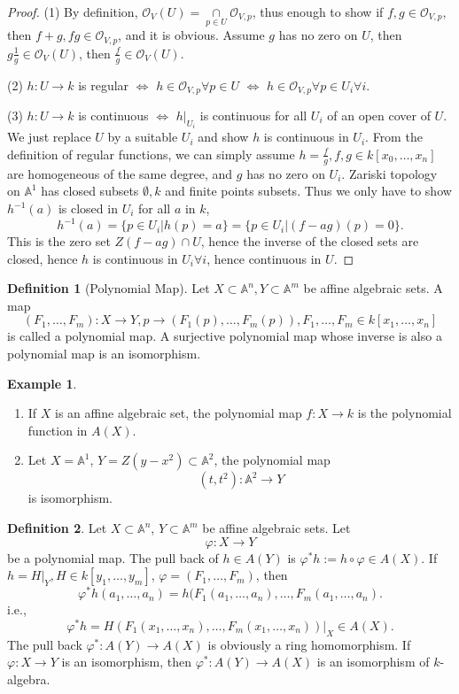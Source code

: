 \documentclass{amsart}
\theoremstyle{plain}
\theoremstyle{definition}
\newtheorem{definition}{Definition}
\newtheorem{example}{Example}
\theoremstyle{remark}
\numberwithin{equation}{section}
\begin{document}
\begin{proof}
	(1) By definition, $ \mathcal{O}_V(U)=\mathop{\cap}\limits_{p\in U} \mathcal{O}_{V,p} $, thus enough to show if $ f,g\in \mathcal{O}_{V,p} $, then $ f+g, fg \in \mathcal{O}_{V,p}$, and it is obvious. Assume $ g $ has no zero on $ U $, then $ g\frac{1}{g}\in \mathcal{O}_V(U) $, then $ \frac{f}{g}\in \mathcal{O}_V(U) $.

	(2) $ h:U\to k $ is regular $ \Leftrightarrow $ $ h\in \mathcal{O}_{V,p} \forall p\in U$ $ \Leftrightarrow $ $ h\in \mathcal{O}_{V,p} \forall p\in U_i \forall i$.

	(3) $ h:U\to k  $ is continuous $ \Leftrightarrow $ $ h|_{U_i} $ is continuous for all $ U_i $ of an open cover of $ U $. We just replace $ U $ by a suitable $ U_i $ and show $ h $ is continuous in $ U_i $. From the definition of regular functions, we can simply assume $ h=\frac{f}{g}, f,g\in k[x_0,\dots,x_n] $ are homogeneous of the same degree, and $ g $ has no zero on $ U_i $. Zariski topology on $ \mathbb{A}^1 $ has closed subsets $ \emptyset,k $ and finite points subsets. Thus we only have to show $ h^{-1}(a) $ is closed in $ U_i $ for all $ a $ in $ k $,
	\begin{equation}
	h^{-1}(a)=\{ p\in U_i|h(p)=a \}= \{ p\in U_i|(f-ag)(p)=0 \}.
	\end{equation}
	This is the zero set $ Z(f-ag)\cap U $, hence the inverse of the closed sets are closed, hence $ h $ is continuous in $ U_i \forall i$, hence continuous in $ U $.
\end{proof}
\begin{definition}[Polynomial Map]
	Let $ X\subset \mathbb{A}^n, Y\subset \mathbb{A}^m $ be affine algebraic sets. A map
	$$
	(F_1,\dots,F_m):X\to Y,p\to (F_1(p),\dots,F_m(p)),F_1,\dots,F_m\in k[x_1,\dots,x_n]
	$$
	is called a polynomial map. A surjective polynomial map whose inverse is also a polynomial map is an isomorphism.
\end{definition}
\begin{example}
	\begin{enumerate}
		\item If $ X $ is an affine algebraic set, the polynomial map $ f:X\to k $ is the polynomial function in $ A(X) $.
		\item Let $ X=\mathbb{A}^1 $, $ Y=Z(y-x^2)\subset \mathbb{A}^2 $, the polynomial map
		$$
		(t,t^2):\mathbb{A}^2\to Y
		$$
		is isomorphism.
	\end{enumerate}
\end{example}
\begin{definition}
	Let $ X\subset \mathbb{A}^n $, $ Y\subset \mathbb{A}^m $ be affine algebraic sets. Let
	$$
	\varphi:X\to Y
	$$
	be a polynomial map.
	The pull back of $ h\in A(Y) $ is $ \varphi^\ast h:=h\circ \varphi \in A(X) $. If $ h=H|_Y, H\in k[y_1,\dots,y_m] $, $ \varphi =(F_1,\dots,F_m) $, then
	$$
	\varphi^\ast h(a_1,\dots,a_n)=h(F_1(a_1,\dots,a_n),\dots, F_m(a_1,\dots,a_n ).
	$$
	i.e.,
	$$
	\varphi^\ast h = H( F_1(x_1,\dots,x_n),\dots, F_m(x_1,\dots,x_n) )|_X\in A(X).
	$$
	The pull back $ \varphi^\ast:A(Y)\to A(X) $ is obviously a ring homomorphism. If $ \varphi:X\to Y $ is an isomorphism, then $ \varphi^\ast:A(Y)\to A(X) $ is an isomorphism of $ k $-algebra.
\end{definition}
\end{document}
